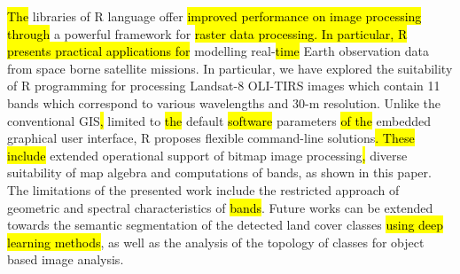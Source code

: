\documentclass[applsci,article,submit,pdftex,moreauthors]{Definitions/mdpi}
\begin{document}
\hl{The }libraries of R language offer \hl{improved performance on image processing through} a powerful framework for \hl{raster data processing. In particular, R presents practical applications for} modelling real-\hl{time} \hl{ }Earth observation data from space borne satellite missions. In particular, we have explored the suitability of R programming for processing Landsat-8 OLI-TIRS images which contain 11 bands which correspond to various wavelengths and\hl{ }30-m resolution. Unlike the conventional GIS\hl{, }limited to \hl{the} default \hl{software} parameters \hl{of the} embedded graphical user interface, R\hl{ }proposes flexible command-line solutions\hl{. These include }extended operational support of bitmap image processing\hl{, }diverse suitability of map algebra and computations of bands, as shown in this paper. The limitations of the presented work include the restricted approach of geometric and spectral characteristics of \hl{bands}. Future works can be extended towards the semantic segmentation of the detected land cover classes \hl{using deep learning methods}, as well as the analysis of the topology of\hl{ }classes for object based image analysis.








\end{document}
